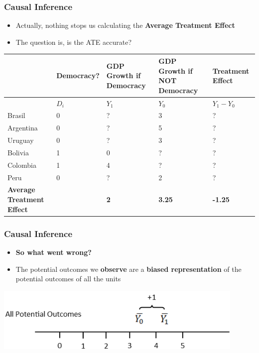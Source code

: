 \documentclass[xcolor=x11names,compress]{beamer}\usepackage[]{graphicx}\usepackage[]{color}
\renewcommand{\(}{\begin{columns}}
\renewcommand{\)}{\end{columns}}
\newcommand{\<}[1]{\begin{column}{#1}}
\renewcommand{\>}{\end{column}}
\begin{document}
\begin{frame}
\frametitle{Causal Inference}
\begin{itemize}
\item Actually, nothing stops us calculating the \textbf{Average Treatment Effect}
\item The question is, is the ATE accurate?
\end{itemize}
\scriptsize
\begin{table}[htbp]
  \centering
    \begin{tabular}{|p{1.8cm}|p{1.8cm}|p{2cm}|p{2cm}|p{2cm}|}
    \hline
          & \multicolumn{1}{p{1.8cm}|}{Democracy?} & \multicolumn{1}{p{2cm}|}{GDP Growth if Democracy} & \multicolumn{1}{p{2.2cm}|}{GDP Growth if NOT Democracy} & \textbf{Treatment Effect} \bigstrut\\
    \hline
          & \multicolumn{1}{p{1.8cm}|}{$D_i$} & \multicolumn{1}{p{2cm}|}{$Y_1$} & \multicolumn{1}{p{2.2cm}|}{$Y_0$} & \multicolumn{1}{p{1.8cm}|}{$Y_{1} - Y_{0}$} \bigstrut\\
    \hline
    Brasil & 0 & ?     & 3     & ? \bigstrut\\
    \hline
    Argentina & 0 & ?    & 5     & ? \bigstrut\\
    \hline
    Uruguay & 0 & ? & 3 & ?  \bigstrut\\
    \hline
    Bolivia & 1 & 0     & ?     & ? \bigstrut\\
    \hline
    Colombia & 1 & 4    & ?    & ? \bigstrut\\
    \hline
    Peru & 0 & ?     & 2     & ? \bigstrut\\
    \hline
    \textbf{Average Treatment Effect} & & \textbf{2} & \textbf{3.25} & \textbf{-1.25} \bigstrut\\
    \hline
    \end{tabular}%
  \label{tab:addlabel}%
\end{table}%
\normalsize
\end{frame}

\begin{frame}
\frametitle{Causal Inference}
\begin{itemize}
\item \textbf{So what went wrong?}
\pause
\item The potential outcomes we \textbf{observe} are a \textbf{biased representation} of the potential outcomes of all the units
\pause
\end{itemize}
\includegraphics[width=0.9\textwidth]{figure/PO_number_line_1.png}
\end{frame}
\end{document}
